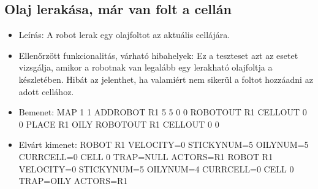 \subsection{Olaj lerakása, már van folt a cellán}
\begin{itemize}
	\item Leírás: \newline
A robot lerak egy olajfoltot az aktuális cellájára.

	\item Ellenőrzött funkcionalitás, várható hibahelyek: \newline
	Ez a teszteset azt az esetet vizsgálja, amikor a robotnak van legalább egy lerakható olajfoltja a készletében. Hibát az jelenthet, ha valamiért nem sikerül a foltot hozzáadni az adott cellához.

	\item Bemenet: \newline
	MAP 1 1 \newline
	ADDROBOT R1 5 5 0 0	 \newline
	ROBOTOUT R1 \newline
	CELLOUT 0 0 \newline
	PLACE R1 OILY \newline
	ROBOTOUT R1 \newline
	CELLOUT 0 0
	\item Elvárt kimenet: \newline
ROBOT R1 VELOCITY=0 STICKYNUM=5 OILYNUM=5 CURRCELL=0 \newline
CELL 0 TRAP=NULL ACTORS=R1 \newline
ROBOT R1 VELOCITY=0 STICKYNUM=5 OILYNUM=4 CURRCELL=0 \newline
CELL 0 TRAP=OILY ACTORS=R1 \newline
 
\end{itemize}

